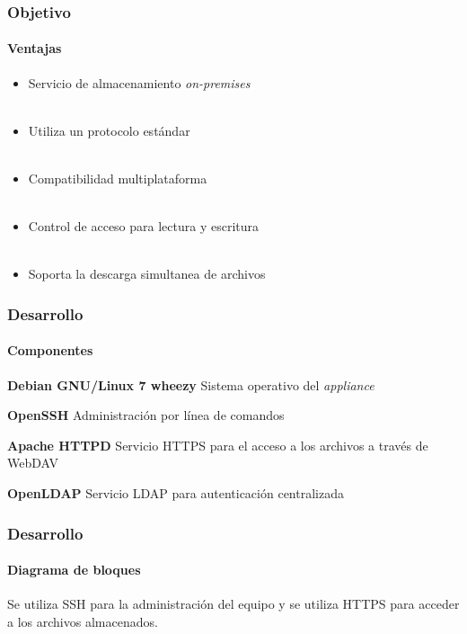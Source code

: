 \documentclass{beamer}
\begin{document}
\begin{frame}
\frametitle{Objetivo}
\framesubtitle{Ventajas}
\justifying

\begin{itemize}
\justifying
  \item Servicio de almacenamiento \textit{on-premises}
\\~\\
  \item Utiliza un protocolo est\'{a}ndar
\\~\\
  \item Compatibilidad multiplataforma
\\~\\
  \item Control de acceso para lectura y escritura
\\~\\
  \item Soporta la descarga simultanea de archivos
\end{itemize}

\end{frame}

\begin{frame}
\frametitle{Desarrollo}
\framesubtitle{Componentes}
\justifying

\begin{block}{\textbf{Debian GNU/Linux 7 \guillemotleft wheezy\guillemotright}}
 Sistema operativo del \textsl{appliance}
\end{block}
\begin{block}{\textbf{\textup{OpenSSH}}}
 Administraci\'{o}n por l\'{i}nea de comandos
\end{block}
\begin{block}{\textbf{Apache \textup{HTTPD}}}
 Servicio \textup{HTTPS} para el acceso a los archivos a trav\'{e}s de \textup{WebDAV}
\end{block}
\begin{block}{\textbf{\textup{OpenLDAP}}}
 Servicio LDAP para autenticaci\'{o}n centralizada
\end{block}

\end{frame}

\begin{frame}
\frametitle{Desarrollo}
\framesubtitle{Diagrama de bloques}

Se utiliza \textup{SSH} para la administraci\'{o}n del equipo y se utiliza \textup{HTTPS} para acceder a los archivos almacenados.

\vspace{1.7em}

\centering
 {
  
 }

\end{frame}
\end{document}
